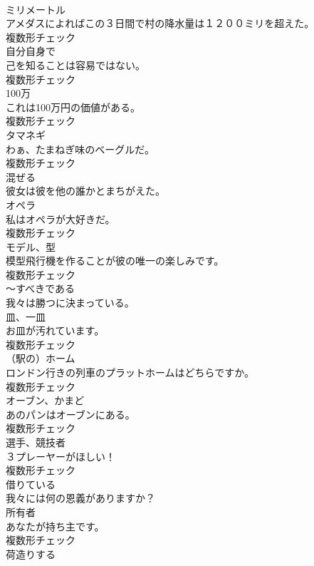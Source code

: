 \documentclass[8pt]{extreport}
\begin{document}
\begin{CJK}{UTF8}{min}
\\	[名詞]	ミリメートル	
\\	アメダスによればこの３日間で村の降水量は１２００ミリを超えた。	
\\	複数形チェック
\\	[代名詞]	自分自身で	
\\	己を知ることは容易ではない。	
\\	複数形チェック
\\	[名詞]	100万	
\\	これは100万円の価値がある。	
\\	複数形チェック
\\	[名詞]	タマネギ	
\\	わぁ、たまねぎ味のベーグルだ。	
\\	複数形チェック
\\	[動詞]	混ぜる	
\\	彼女は彼を他の誰かとまちがえた。	
\\	[名詞]	オペラ	
\\	私はオペラが大好きだ。	
\\	複数形チェック
\\	[名詞]	モデル、型	
\\	模型飛行機を作ることが彼の唯一の楽しみです。	
\\	複数形チェック
\\	[助動詞]	〜すべきである	
\\	我々は勝つに決まっている。	
\\	[名詞]	皿、一皿	
\\	お皿が汚れています。	
\\	複数形チェック
\\	[名詞]	（駅の）ホーム	
\\	ロンドン行きの列車のプラットホームはどちらですか。	
\\	複数形チェック
\\	[名詞]	オーブン、かまど	
\\	あのパンはオーブンにある。	
\\	複数形チェック
\\	[名詞]	選手、競技者	
\\	３プレーヤーがほしい！	
\\	複数形チェック
\\	[動詞]	借りている	
\\	我々には何の恩義がありますか？	
\\	[名詞]	所有者	
\\	あなたが持ち主です。	
\\	複数形チェック
\\	[動詞]	荷造りする	

\end{CJK}
\end{document}
